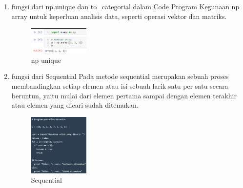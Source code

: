 \begin{enumerate}
        \item fungsi dari np.unique dan to\_categorial dalam Code Program
Kegunaan np array untuk keperluan analisis data, seperti operasi vektor dan matriks.

	\begin{figure}[H]
		\includegraphics[width=3cm]{figures/1174008/6/teori7.PNG}
            	\centering
           	 \caption{np unique}
       	 \end{figure}

        \item fungsi dari Sequential
Pada metode sequential merupakan sebuah proses membandingkan setiap elemen atau isi sebuah larik satu per satu secara beruntun, yaitu mulai dari elemen pertama sampai dengan elemen terakhir atau elemen yang dicari sudah ditemukan.

	\begin{figure}[H]
		\includegraphics[width=3cm]{figures/1174008/6/teori8.PNG}
            	\centering
           	 \caption{Sequential}
       	 \end{figure}
\end{enumerate}

